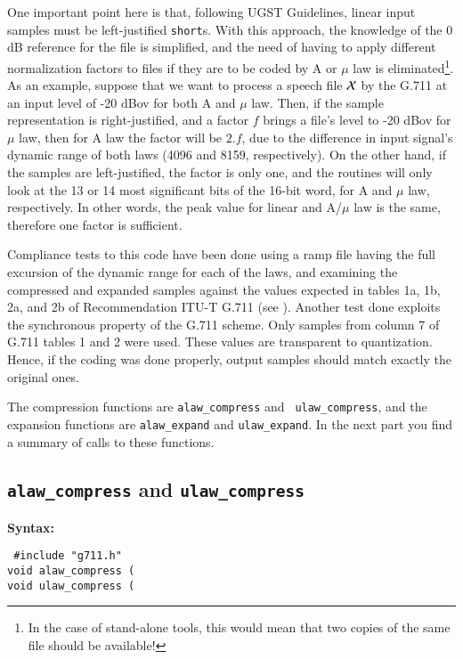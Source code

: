 One important point here is that, following UGST Guidelines, linear
input samples must be left-justified {\tt short}s. With this approach,
the knowledge of the 0 dB reference for the file is simplified, and the
need of having to apply different normalization factors to files if
they are to be coded by A or $\mu$ law is eliminated\footnote{\SF In
the case of stand-alone tools, this would mean that two copies of the
same file should be available!}. As an example, suppose that we want to
process a speech file $\cal X$ by the G.711 at an input level of -20
dBov for both A and $\mu$ law. Then, if the sample representation is
right-justified, and a factor $f$ brings a file's level to -20 dBov for
$\mu$ law, then for A law the factor will be $2.f$, due to the
difference in input signal's dynamic range of both laws (4096 and 8159,
respectively). On the other hand, if the samples are left-justified,
the factor is only one, and the routines will only look at the 13 or 14
most significant bits of the 16-bit word, for A and $\mu$ law,
respectively. In other words, the peak value for linear and A/$\mu$ law
is the same, therefore one factor is sufficient.

Compliance tests to this code have been done using a ramp file having
the full excursion of the dynamic range for each of the laws, and
examining the compressed and expanded samples against the values
expected in tables 1a, 1b, 2a, and 2b of Recommendation ITU-T G.711 (see
\cite{G.711}). Another test done exploits the synchronous property of
the G.711 scheme. Only samples from column 7 of G.711 tables 1 and 2
were used. These values are transparent to quantization. Hence, if
the coding was done properly, output samples should match exactly the
original ones.

The compression functions are {\tt alaw\_compress} and {\tt
ulaw\_compress}, and the expansion functions are {\tt alaw\_expand} and
{\tt ulaw\_expand}. In the next part you find a summary of calls to
these functions.

\subsection{{\tt alaw\_compress} and {\tt ulaw\_compress}}

{\bf Syntax: } 

{\tt
\#include "g711.h"\\
void alaw\_compress
         (\\
void ulaw\_compress
         (
}

